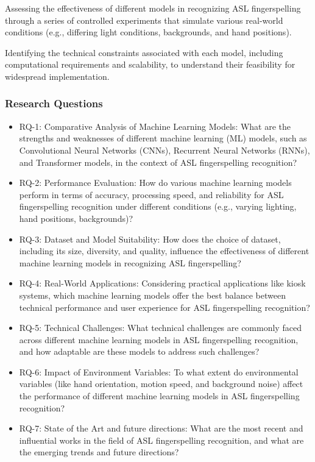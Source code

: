 Assessing the effectiveness of different models in recognizing ASL fingerspelling through a series of controlled experiments that simulate various real-world conditions (e.g., differing light conditions, backgrounds, and hand positions).

Identifying the technical constraints associated with each model, including computational requirements and scalability, to understand their feasibility for widespread implementation.

\subsubsection{Research Questions}
\begin{itemize}
    \item RQ-1: Comparative Analysis of Machine Learning Models:
          What are the strengths and weaknesses of different machine learning (ML) models, such as Convolutional Neural Networks (CNNs), Recurrent Neural Networks (RNNs), and Transformer models, in the context of ASL fingerspelling recognition?
    \item RQ-2: Performance Evaluation:
          How do various machine learning models perform in terms of accuracy, processing speed, and reliability for ASL fingerspelling recognition under different conditions (e.g., varying lighting, hand positions, backgrounds)?
    \item RQ-3: Dataset and Model Suitability:
          How does the choice of dataset, including its size, diversity, and quality, influence the effectiveness of different machine learning models in recognizing ASL fingerspelling?
    \item RQ-4: Real-World Applications:
          Considering practical applications like kiosk systems, which machine learning models offer the best balance between technical performance and user experience for ASL fingerspelling recognition?
    \item RQ-5: Technical Challenges:
          What technical challenges are commonly faced across different machine learning models in ASL fingerspelling recognition, and how adaptable are these models to address such challenges?
    \item RQ-6: Impact of Environment Variables:
          To what extent do environmental variables (like hand orientation, motion speed, and background noise) affect the performance of different machine learning models in ASL fingerspelling recognition?
    \item RQ-7: State of the Art and future directions:
          What are the most recent and influential works in the field of ASL fingerspelling recognition, and what are the emerging trends and future directions?
\end{itemize}

